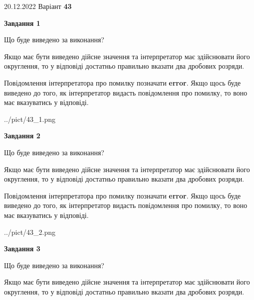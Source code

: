 \documentclass[12pt, ukrainian]{article}
\begin{document}
{20.12.2022 Варіант \No \textbf { 43 }\par}
{
\begin {Large}

{\begin {center}\textbf{Завдання 1}\end {center}}\par
Що буде виведено за виконання? \par

Якщо має бути виведено дійсне значення та інтерпретатор має здійснювати його округлення, 
то у відповіді достатньо правильно вказати два дробових розряди.

Повідомлення інтерпретатора про помилку позначати \textbf{error}.
Якщо щось буде виведено до того, як інтерпретатор видасть повідомлення про помилку, 
то воно має вказуватись у відповіді. \par

\begin{center}
	{../pict/43_1.png}
\end{center}
\newpage

{\begin {center}\textbf{Завдання 2}\end {center}}\par
Що буде виведено за виконання? \par

Якщо має бути виведено дійсне значення та інтерпретатор має здійснювати його округлення, 
то у відповіді достатньо правильно вказати два дробових розряди.

Повідомлення інтерпретатора про помилку позначати \textbf{error}.
Якщо щось буде виведено до того, як інтерпретатор видасть повідомлення про помилку, 
то воно має вказуватись у відповіді. \par

\begin{center}
	{../pict/43_2.png}
\end{center}
\newpage

{\begin {center}\textbf{Завдання 3}\end {center}}\par
Що буде виведено за виконання? \par

Якщо має бути виведено дійсне значення та інтерпретатор має здійснювати його округлення, 
то у відповіді достатньо правильно вказати два дробових розряди.


\end{Large}}
\end{document}
